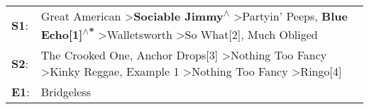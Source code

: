 \begin{supertabular}{p{0.03\textwidth}p{0.92\textwidth}}
 \textbf{S1}:  &  Great American\textsuperscript{} \textgreater \enspace \textbf{Sociable Jimmy\textsuperscript{$\wedge$}} \textgreater \enspace Partyin' Peeps\textsuperscript{}, \enspace \textbf{Blue Echo[1]\textsuperscript{$\wedge$*}} \textgreater \enspace Walletsworth\textsuperscript{} \textgreater \enspace So What[2]\textsuperscript{}, \enspace Much Obliged\textsuperscript{}  \enspace  \\
 \textbf{S2}:  &                                The Crooked One\textsuperscript{}, \enspace Anchor Drops[3]\textsuperscript{} \textgreater \enspace Nothing Too Fancy\textsuperscript{} \textgreater \enspace Kinky Reggae\textsuperscript{}, \enspace Example 1\textsuperscript{} \textgreater \enspace Nothing Too Fancy\textsuperscript{} \textgreater \enspace Ringo[4]\textsuperscript{}  \enspace  \\
 \textbf{E1}:  &                                                                                                                                                                                                                                                                                                                                                 Bridgeless\textsuperscript{}  \enspace  \\
\end{supertabular}
